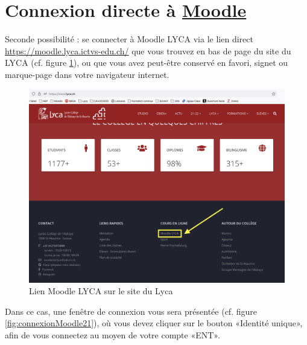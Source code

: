 \documentclass[10pt,a4paper]{report}
\begin{document}
\section{Connexion directe à \href{https://moodle.lyca.ictvs-edu.ch/}{Moodle}}

Seconde possibilité : se connecter à Moodle LYCA via le lien direct \href{https://moodle.lyca.ictvs-edu.ch/}{https://moodle.lyca.ictvs-edu.ch/} que vous trouvez en bas de page du site du LYCA (cf. figure \ref{fig:siteLycaLienMoodle}), ou que vous avez peut-être conservé en favori, signet ou marque-page dans votre navigateur internet.

\begin{figure} [H]
	\centering
	\includegraphics[width=0.8\linewidth]{images/capture_site_lyca_lien_moodle}
	\caption{Lien Moodle LYCA sur le site du Lyca}
	\label{fig:siteLycaLienMoodle}
\end{figure}

\newpage


Dans ce cas, une fenêtre de connexion vous sera présentée (cf. figure \ref{fig:connexionMoodle21}), où vous devez cliquer sur le bouton «Identité unique», afin de vous connectez au moyen de votre compte «ENT». \\
\end{document}
